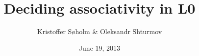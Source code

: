 \documentclass[12pt, serif, xcolor=table]{beamer}
\title{Deciding associativity in L0}
\author{Kristoffer S\o holm \& Oleksandr Shturmov}
\date{June 19, 2013}
\begin{document}
\begin{frame}

\titlepage

\end{frame}

















\end{document}
